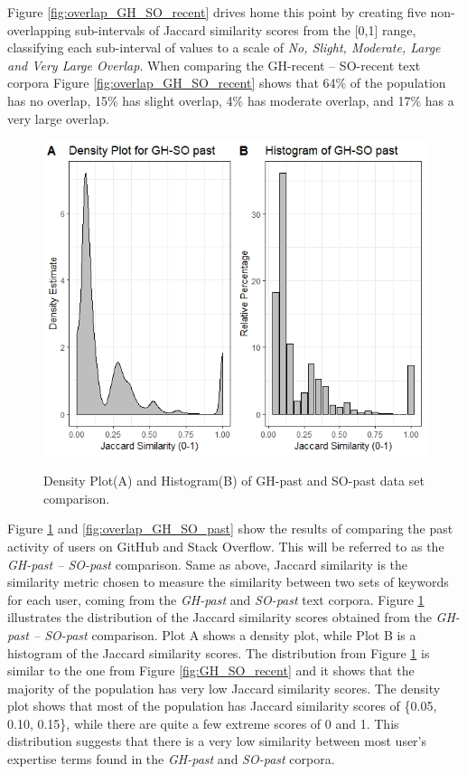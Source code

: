         Figure \ref{fig:overlap_GH_SO_recent} drives home this point by creating five non-overlapping sub-intervals of Jaccard similarity scores from the [0,1] range, classifying each sub-interval of values to a scale of \emph{No, Slight, Moderate, Large and Very Large Overlap}. When comparing the GH-recent -- SO-recent text corpora Figure \ref{fig:overlap_GH_SO_recent} shows that 64\% of the population has no overlap, 15\% has slight overlap, 4\% has moderate overlap, and 17\% has a very large overlap. 
        
        \begin{figure}
          \centering
          \includegraphics[width=\textwidth]{figures/GH_SO_past.jpeg}\\
          \caption{Density Plot(A) and Histogram(B) of GH-past and SO-past data set comparison.}
          \label{fig:GH_SO_past}
        \end{figure}
        
        Figure \ref{fig:GH_SO_past} and \ref{fig:overlap_GH_SO_past} show the results of comparing the past activity of users on GitHub and Stack Overflow. This will be referred to as the \emph{GH-past -- SO-past} comparison. Same as above, Jaccard similarity is the similarity metric chosen to measure the similarity between two sets of keywords for each user, coming from the \emph{GH-past} and \emph{SO-past} text corpora. Figure \ref{fig:GH_SO_past} illustrates the distribution of the Jaccard similarity scores obtained from the \emph{GH-past -- SO-past} comparison. Plot A shows a density plot, while Plot B is a  histogram of the Jaccard similarity scores. The distribution from Figure \ref{fig:GH_SO_past} is similar to the one from Figure \ref{fig:GH_SO_recent} and it shows that the majority of the population has very low Jaccard similarity scores. The density plot shows that most of the population has Jaccard similarity scores of \{0.05, 0.10, 0.15\}, while there are quite a few extreme scores of 0 and 1. This distribution suggests that there is a very low similarity between most user's expertise terms found in the \emph{GH-past} and \emph{SO-past} corpora. 
        
